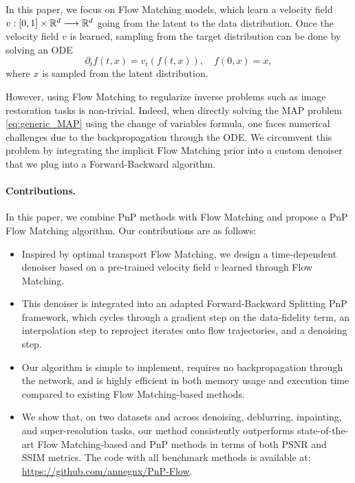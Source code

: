 \documentclass{article} %
\theoremstyle{definition}
\begin{document}
In this paper, we focus on Flow Matching models, which learn a velocity field $v : [0,1] \times \mathbb{R}^d \longrightarrow \mathbb{R}^d$ going from the latent to the data distribution.
Once the velocity field $v$ is learned, sampling from the target distribution can be done by solving an ODE \citep{chen2018neural}
\begin{equation*}\label{eq:forward_ODE}
 \partial_t f(t,x) = v_t(f(t,x)), \quad       f(0,x) = x,
\end{equation*}
where $x$ is sampled from the latent distribution. 

However, using Flow Matching to regularize inverse problems such as image restoration tasks is non-trivial. Indeed, when directly solving the MAP problem \eqref{eq:generic_MAP} using the change of variables formula, one faces numerical challenges due to the backpropagation through the ODE. 
We circumvent this problem by integrating the implicit Flow Matching prior into a custom denoiser that we plug into a Forward-Backward algorithm.


 
\paragraph{Contributions.}
In this paper, we combine PnP methods with Flow Matching and propose a PnP Flow Matching algorithm.  Our contributions are as follows: 
\begin{itemize}
\item Inspired by optimal transport Flow Matching, we design a time-dependent denoiser based on a pre-trained velocity field $v$ learned through Flow Matching.
\item This denoiser is integrated into an adapted Forward-Backward Splitting PnP framework, which cycles through a gradient step on the data-fidelity term, an interpolation step to reproject iterates onto flow trajectories, and a denoising step.
\item Our algorithm is simple to implement, requires no backpropagation through the network, and is highly efficient in both memory usage and execution time compared to existing Flow Matching-based methods.
\item We show that, on two datasets and across denoising, deblurring, inpainting, and super-resolution tasks, our method consistently outperforms state-of-the-art Flow Matching-based and PnP methods in terms of both PSNR and SSIM metrics. The code with all benchmark methods is available at: \url{https://github.com/annegnx/PnP-Flow}. 
\end{itemize}
\end{document}
